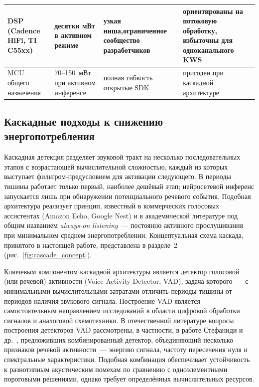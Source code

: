 \begin{longtable}{|L{3cm}|L{3.5cm}|L{3.5cm}|L{4cm}|}
	DSP \newline (Cadence HiFi, TI C55xx)   & десятки мВт в активном режиме                          & узкая ниша,\newline ограниченное сообщество разработчиков & ориентированы на \newline потоковую обработку, избыточны для одноканального KWS \\ \hline
	MCU общего назначения                   & 70--150~мВт при активном инференсе~\cite{src:8}        & полная гибкость \newline открытые SDK                     & пригоден при каскадной архитектуре                                              \\
	\hline
\end{longtable}

\subsection{Каскадные подходы к снижению энергопотребления}

Каскадная детекция разделяет звуковой тракт на несколько последовательных
этапов с возрастающей вычислительной сложностью, каждый из которых
выступает фильтром-предусловием для активации следующего. В периоды
тишины работает только первый, наиболее дешёвый этап; нейросетевой
инференс запускается лишь при обнаружении потенциального речевого
события. Подобная архитектура реализует принцип, известный в коммерческих
голосовых ассистентах (Amazon Echo, Google Nest) и в академической
литературе под общим названием \textit{always-on listening}~--- постоянно
активного прослушивания при минимальном среднем энергопотреблении.
Концептуальная схема каскада, принятого в настоящей работе, представлена
в разделе~2 (рис.~\ref{fig:cascade_concept}).

Ключевым компонентом каскадной архитектуры является детектор голосовой
(или речевой) активности (Voice Activity Detector, VAD), задача которого~---
с минимальными вычислительными затратами отличить периоды тишины от
периодов наличия звукового сигнала. Построение VAD является
самостоятельным направлением исследований в области цифровой обработки
сигналов и аналоговой схемотехники. В отечественной литературе вопросы
построения детекторов VAD рассмотрены, в частности, в работе Стефаниди и
др.~\cite{src:23}, предложивших комбинированный детектор, объединяющий
несколько признаков речевой активности~--- энергию сигнала, частоту
пересечения нуля и спектральные характеристики. Подобная комбинация
обеспечивает устойчивость к разнотипным акустическим помехам по
сравнению с одноэлементными пороговыми решениями, однако требует
определённых вычислительных ресурсов.

